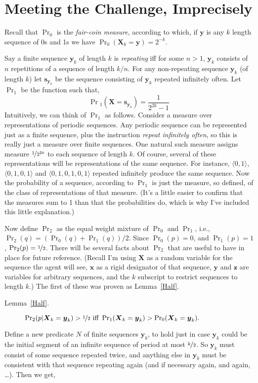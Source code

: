 \documentclass{ergoclass}
\newcommand{\vx}{\boldsymbol{x}}
\newcommand{\vX}{\boldsymbol{X}}
\newcommand{\vs}{\boldsymbol{s}}
\newcommand{\vy}{\boldsymbol{y}}
\newcommand{\vz}{\boldsymbol{z}}
\begin{document}
\section{Meeting the Challenge, Imprecisely}

Recall that $\Pr_0$ is the \textit{fair-coin measure}, according to which, if $\vy$ is  any $k$ length sequence of 0s and 1s we have $\Pr_0(\vX_k = \vy) = 2^{-k}$. 

Say a finite sequence $\vy_k$ of length $k$ is \textit{repeating} iff for some $n > 1$, $\vy_k$ consists of $n$ repetitions of a sequence of length $k/n$. For any non-repeating sequence $\vy_k$ (of length $k$) let $\vs_{\vy_k}$ be the sequence consisting of $\vy_k$ repeated infinitely often. Let $\Pr_1$ be the function such that,
%
\[
\Pr{}_1(\vX = \vs_{\vy_k}) = \frac{1}{2^{2k}-1}
\]
%
Intuitively, we can think of $\Pr_1$ as follows. Consider a measure over representations of periodic sequences. Any periodic sequence can be represented just as a finite sequence, plus the instruction \textit{repeat infinitely often}, so this is really just a measure over finite sequences. One natural such measure assigns measure $\nicefrac{1}{2^{2k}}$ to each sequence of length $k$. Of course, several of these representations will be representations of the same sequence. For instance, $\langle 0, 1 \rangle$, $\langle 0, 1, 0, 1 \rangle$ and $\langle 0, 1, 0, 1, 0, 1 \rangle$ repeated infinitely produce the same sequence. Now the probability of a sequence, according to $\Pr_1$ is just the measure, so defined, of the class of representations of that measure. (It's a little easier to confirm that the measures sum to 1 than that the probabilities do, which is why I've included this little explanation.)

Now define $\Pr_2$ as the equal weight mixture of $\Pr_0$ and $\Pr_1$, i.e., $\Pr_2(q) = (\Pr_0(q) + \Pr_1(q))/2$. Since $\Pr_0(p) = 0$, and $\Pr_1(p) = 1$, $\Pr_2(p) = \nicefrac{1}{2}$. There will be several facts about $\Pr_2$ that are useful to have in place for future reference. (Recall I'm using $\vX$ as a random variable for the sequence the agent will see, $\vx$ as a rigid designator of that sequence,  $\vy$ and $\vz$ are variables for arbitrary sequences, and the $k$ subscript to restrict sequences to length $k$.) The first of these was proven as Lemma~\ref{Half}.

\begin{description}
\item[Lemma~\ref{Half}.] $\Pr_2(p | \vX_k = \vy_k) > \nicefrac{1}{2} \text{ iff } \Pr_1(\vX_k = \vy_k) > \Pr_0(\vX_k = \vy_k).$
\end{description}
%
\noindent Define a new predicate $N$ of finite sequences $\vy_k$, to hold just in case $\vy_k$ could be the initial segment of an infinite sequence of period at most $\nicefrac{k}{2}$. So $\vy_k$ must consist of some sequence repeated twice, and anything else in $\vy_k$ must be consistent with that sequence repeating again (and if necessary again, and again, \dots). Then we get,
\end{document}
